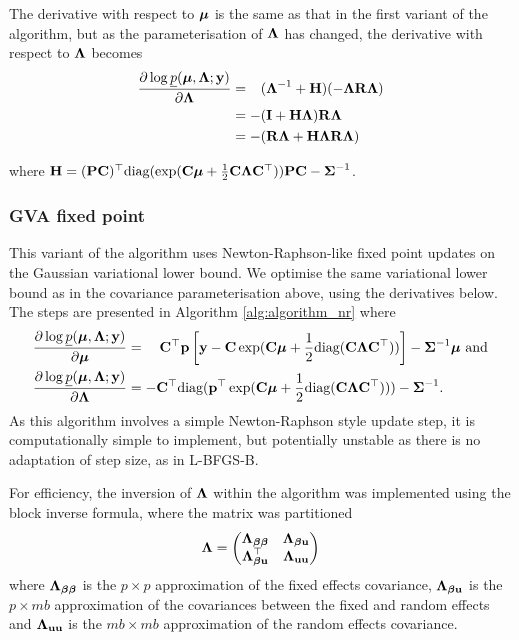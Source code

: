 	\noindent The derivative with respect to ${\boldsymbol \mu}$ is the same as that in the first variant of the algorithm, but 
	as the parameterisation of ${\boldsymbol \Lambda}$ has changed, the  derivative with respect to ${\boldsymbol \Lambda}$ becomes
	\begin{align*}
		\frac{\partial \log \underline{p}({\boldsymbol \mu}, {\boldsymbol \Lambda}; {\bf y})}{\partial {\boldsymbol\Lambda}}
		  & = \hphantom{-}({\boldsymbol \Lambda}^{-1} + {\bf H})(-{\boldsymbol \Lambda} {\bf R} {\boldsymbol \Lambda}) \\
		  & = -({\bf I} + {\bf H}{\boldsymbol \Lambda}){\bf R}{\boldsymbol \Lambda}                           \\
		  & = - ({\bf R}{\boldsymbol \Lambda} + {\bf H}{\boldsymbol \Lambda}{\bf R}{\boldsymbol \Lambda})                  
	\end{align*} 
			
	\noindent where ${\bf H} = ({\bf P} {\bf C})^\top \text{diag}(\exp({\bf C} {\boldsymbol \mu} + \frac{1}{2} {\bf C} {\boldsymbol \Lambda} {\bf C}^\top)) {\bf P} {\bf C} - {\boldsymbol \Sigma}^{-1}$.
			
	\subsubsection{GVA fixed point}
			
			
	This variant of the algorithm uses Newton-Raphson-like fixed point updates on the Gaussian variational lower
	bound. We optimise the same variational lower bound as in the covariance parameterisation above, using the
	derivatives below. The steps are presented in Algorithm \ref{alg:algorithm_nr} where	
	\begin{align*}
		\frac{\partial \log \underline{p}({\boldsymbol \mu}, {\boldsymbol \Lambda}; {\bf y})}{\partial {\boldsymbol\mu}}     & = \quad {\bf C}^\top{\bf p} \left [{\bf y} - {\bf C}\exp({\bf C} {\boldsymbol \mu} + \frac{1}{2} \text{diag}({\bf C} {\boldsymbol \Lambda} {\bf C}^\top)) \right ] - {\boldsymbol \Sigma}^{-1} {\boldsymbol \mu} \text{ and} \\
		\frac{\partial \log \underline{p}({\boldsymbol \mu}, {\boldsymbol \Lambda}; {\bf y})}{\partial {\boldsymbol\Lambda}} & = -{\bf C}^\top \text{diag}({\bf p}^\top \exp({\bf C} {\boldsymbol \mu} +\frac{1}{2} \text{diag}({\bf C} {\boldsymbol \Lambda} {\bf C}^\top))) - {\boldsymbol \Sigma}^{-1}.                             
	\end{align*}
	As this algorithm involves a simple Newton-Raphson style update step, it is computationally simple to
	implement, but potentially unstable as there is no adaptation of step size, as in L-BFGS-B.

	For efficiency, the inversion of ${\boldsymbol \Lambda}$ within the algorithm was implemented using the block inverse 
	formula, where	the matrix was partitioned
	\[
		{\boldsymbol \Lambda} =
		\begin{pmatrix}
			{\boldsymbol\Lambda}_{{\boldsymbol \beta} {\boldsymbol \beta}} & {\boldsymbol \Lambda}_{{\boldsymbol \beta} {\bf u}} \\
			{\boldsymbol \Lambda}_{{\boldsymbol \beta} {\bf u}}^\top & {\boldsymbol \Lambda}_{{\bf u} {\bf u}}
		\end{pmatrix}
	\]
	where ${\boldsymbol \Lambda}_{{\boldsymbol \beta} {\boldsymbol \beta}}$ is the $p \times p$ approximation of the fixed effects covariance, ${\boldsymbol \Lambda}_{{\boldsymbol \beta} {\bf u}}$ is the $p \times mb$
	approximation of the covariances between the fixed and random effects and ${\boldsymbol \Lambda}_{{\bf u} {\bf u}}$ is the $mb \times mb$
	approximation of the random effects covariance.

